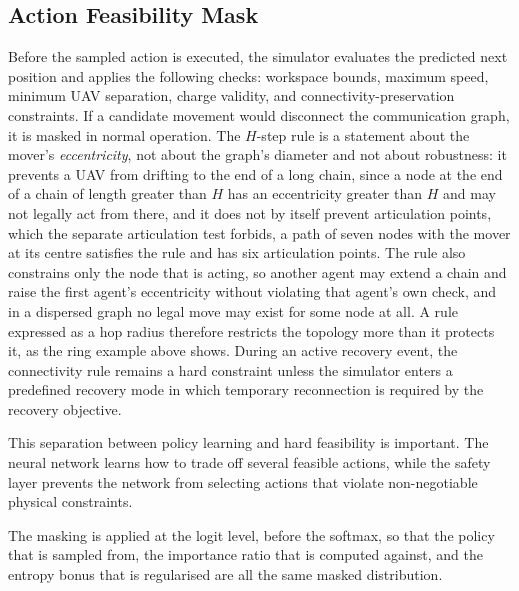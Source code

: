\documentclass[conference]{IEEEtran}
\begin{document}
\subsection{Action Feasibility Mask}
Before the sampled action is executed, the simulator evaluates the predicted next position and applies the following checks: workspace bounds, maximum speed, minimum UAV separation, charge validity, and connectivity-preservation constraints. If a candidate movement would disconnect the communication graph, it is masked in normal operation.  The $H$-step rule is a statement about the mover's \emph{eccentricity}, not about the graph's diameter and not about robustness: it prevents a UAV from drifting to the end of a long chain, since a node at the end of a chain of length greater than $H$ has an eccentricity greater than $H$ and may not legally act from there, and it does not by itself prevent articulation points, which the separate articulation test forbids, a path of seven nodes with the mover at its centre satisfies the rule and has six articulation points. The rule also constrains only the node that is acting, so another agent may extend a chain and raise the first agent's eccentricity without violating that agent's own check, and in a dispersed graph no legal move may exist for some node at all.  A rule expressed as a hop radius therefore restricts the topology more than it protects it, as the ring example above shows. During an active recovery event, the connectivity rule remains a hard constraint unless the simulator enters a predefined recovery mode in which temporary reconnection is required by the recovery objective.

This separation between policy learning and hard feasibility is important. The neural network learns how to trade off several feasible actions, while the safety layer prevents the network from selecting actions that violate non-negotiable physical constraints.

The masking is applied at the logit level, before the softmax, so that the policy that is sampled from, the importance ratio that is computed against, and the entropy bonus that is regularised are all the same masked distribution.
\end{document}
